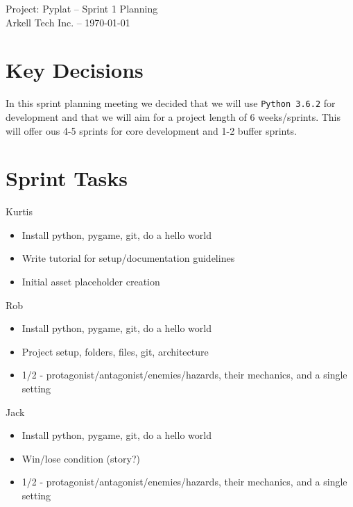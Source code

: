 \documentclass[10pt]{article}
\begin{document}
\begin{center}
\large{Project: Pyplat -- Sprint 1 Planning}\\
\normalsize{Arkell Tech Inc. -- \today}
\end{center}
\hrulefill

\section{Key Decisions}

In this sprint planning meeting we decided that we will use \texttt{Python 3.6.2} for development and that we will aim for a project length of 6 weeks/sprints. This will offer ous 4-5 sprints for core development and 1-2 buffer sprints.  

\section{Sprint Tasks}
Kurtis
\begin{itemize}
\item Install python, pygame, git, do a hello world
\item Write tutorial for setup/documentation guidelines
\item Initial asset placeholder creation
\end{itemize}

\noindent
Rob
\begin{itemize}
\item Install python, pygame, git, do a hello world
\item Project setup, folders, files, git, architecture
\item 1/2 - protagonist/antagonist/enemies/hazards, their mechanics, and a single setting
\end{itemize}

\noindent
Jack
\begin{itemize}
\item Install python, pygame, git, do a hello world
\item Win/lose condition (story?)
\item 1/2 - protagonist/antagonist/enemies/hazards, their mechanics, and a single setting
\end{itemize}
\end{document}
